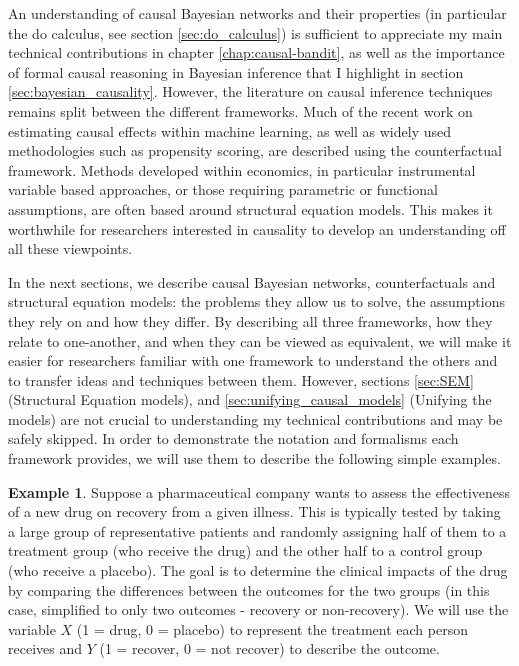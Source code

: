 \documentclass[11pt,a4paper,twoside]{report}
\theoremstyle{plain}
\theoremstyle{definition}
\newtheorem{example}[theorem]{Example}
\begin{document}
An understanding of causal Bayesian networks and their properties (in particular the do calculus, see section \ref{sec:do_calculus}) is sufficient to appreciate my main technical contributions in chapter \ref{chap:causal-bandit}, as well as the importance of formal causal reasoning in Bayesian inference that I highlight in section  \ref{sec:bayesian_causality}. However, the literature on causal inference techniques remains split between the different frameworks. Much of the recent work on estimating causal effects within machine learning, as well as widely used methodologies such as propensity scoring, are described using the counterfactual framework. Methods developed within economics, in particular instrumental variable based approaches, or those requiring parametric or functional assumptions, are often based around structural equation models. This makes it worthwhile for researchers interested in causality to develop an understanding off all these viewpoints.

In the next sections, we describe causal Bayesian networks, counterfactuals and structural equation models: the problems they allow us to solve, the assumptions they rely on and how they differ. By describing all three frameworks, how they relate to one-another, and when they can be viewed as equivalent, we will make it easier for researchers familiar with one framework to understand the others and to transfer ideas and techniques between them. However, sections \ref{sec:SEM} (Structural Equation models), and \ref{sec:unifying_causal_models} (Unifying the models) are not crucial to understanding my technical contributions and may be safely skipped. In order to demonstrate the notation and formalisms each framework provides, we will use them to describe the following simple examples. 

\vspace*{.3cm}
\begin{example}
\label{exm:ranomized_experiment}
Suppose a pharmaceutical company wants to assess the effectiveness of a new drug on recovery from a given illness. This is typically tested by taking a large group of representative patients and randomly assigning half of them to a treatment group (who receive the drug) and the other half to a control group (who receive a placebo). The goal is to determine the clinical impacts of the drug by comparing the differences between the outcomes for the two groups (in this case, simplified to only two outcomes - recovery or non-recovery). We will use the variable $X$ (1 = drug, 0 = placebo) to represent the treatment each person receives and $Y$ (1 = recover, 0 = not recover) to describe the outcome. 
\end{example}
\end{document}
